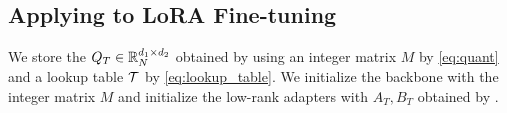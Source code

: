 

\subsection{Applying to LoRA Fine-tuning}
We store the $Q_T \in \mathbb{R}_N^{d_1 \times d_2}$ obtained by {\OurAlg} using an integer matrix $M$ by \eqref{eq:quant} and a lookup table ${\mathcal{T}}$ by \eqref{eq:lookup_table}. 
We initialize the backbone with the integer matrix $M$ and initialize the low-rank adapters with $A_T, B_T$ obtained by {\OurAlg}. 

